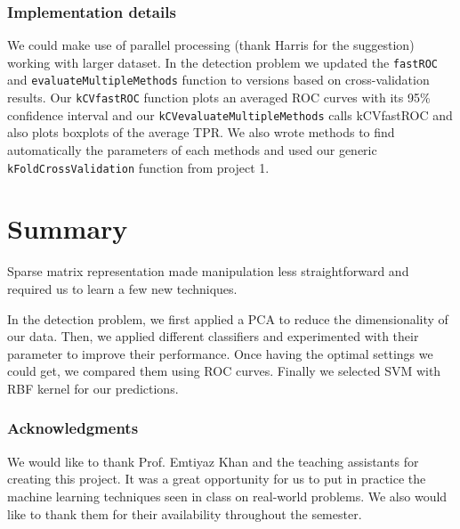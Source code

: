 \documentclass[10pt,a4paper]{article}
\begin{document}
 \subsubsection*{Implementation details}
    We could make use of parallel processing (thank Harris for the suggestion) working with larger dataset. In the detection problem we updated the \texttt{fastROC} and \texttt{evaluateMultipleMethods} function to versions based on cross-validation results. Our \texttt{kCVfastROC} function plots an averaged ROC curves with its 95\% confidence interval and our \texttt{kCVevaluateMultipleMethods} calls kCVfastROC and also plots boxplots of the average TPR. We also wrote methods to find automatically the parameters of each methods and used our generic \texttt{kFoldCrossValidation} function from project 1.

\section{Summary}
  Sparse matrix representation made manipulation less straightforward and required us to learn a few new techniques.

  In the detection problem, we first applied a PCA to reduce the dimensionality of our data. Then, we applied different classifiers and experimented with their parameter to improve their performance. Once having the optimal settings we could get, we compared them using ROC curves. Finally we selected SVM with RBF kernel for our predictions.

    \subsubsection*{Acknowledgments}
    We would like to thank Prof. Emtiyaz Khan and the teaching assistants for creating this project. It was a great opportunity for us to put in practice the machine learning techniques seen in class on real-world problems. We also would like to thank them for their availability throughout the semester.\\
\end{document}
